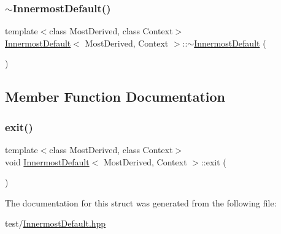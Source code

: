 \subsubsection{\texorpdfstring{$\sim$\+Innermost\+Default()}{~InnermostDefault()}}
{\footnotesize\ttfamily template$<$class Most\+Derived, class Context$>$ \\
\mbox{\hyperlink{struct_innermost_default}{Innermost\+Default}}$<$ Most\+Derived, Context $>$\+::$\sim$\mbox{\hyperlink{struct_innermost_default}{Innermost\+Default}} (\begin{DoxyParamCaption}{ }\end{DoxyParamCaption})\hspace{0.3cm}{\ttfamily [inline]}}



\subsection{Member Function Documentation}
\mbox{\label{struct_innermost_default_a1676dc4b5accc3396d76ee38277e4d44}} 
\subsubsection{\texorpdfstring{exit()}{exit()}}
{\footnotesize\ttfamily template$<$class Most\+Derived, class Context$>$ \\
void \mbox{\hyperlink{struct_innermost_default}{Innermost\+Default}}$<$ Most\+Derived, Context $>$\+::exit (\begin{DoxyParamCaption}{ }\end{DoxyParamCaption})\hspace{0.3cm}{\ttfamily [inline]}}



The documentation for this struct was generated from the following file\+:\begin{DoxyCompactItemize}
\item 
test/\mbox{\hyperlink{_innermost_default_8hpp}{Innermost\+Default.\+hpp}}\end{DoxyCompactItemize}
